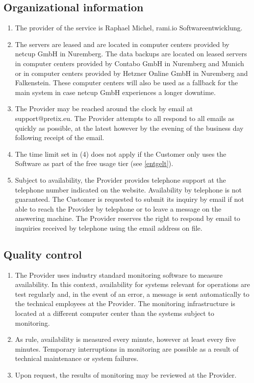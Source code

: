 \documentclass{terms}
\begin{document}
\subsection{Organizational information}
\begin{enumerate}
\item The provider of the service is Raphael Michel, rami.io Softwareentwicklung.
\item The servers are leased and are located in computer centers provided by netcup GmbH in Nuremberg. The data backups are located on leased servers in computer centers provided by Contabo GmbH in Nuremberg and Munich or in computer centers provided by Hetzner Online GmbH in Nuremberg and Falkenstein. These computer centers will also be used as a fallback for the main system in case netcup GmbH experiences a longer downtime.
\item The Provider may be reached around the clock by email at support@pretix.eu. The Provider attempts to all respond to all emails as quickly as possible, at the latest however by the evening of the business day following receipt of the email.
\item The time limit set in (4) does not apply if the Customer only uses the Software as part of the free usage tier (see \ref{entgelt}).
\item Subject to availability, the Provider provides telephone support at the telephone number indicated on the website. Availability by telephone is not guaranteed. The Customer is requested to submit its inquiry by email if not able to reach the Provider by telephone or to leave a message on the answering machine. The Provider reserves the right to respond by email to inquiries received by telephone using the email address on file.
\end{enumerate}

\subsection{Quality control}
\begin{enumerate}
\item The Provider uses industry standard monitoring software to measure availability. In this context, availability for systems relevant for operations are test regularly and, in the event of an error, a message is sent automatically to the technical employees at the Provider. The monitoring infrastructure is located at a different computer center than the systems subject to monitoring.
\item As rule, availability is measured every minute, however at least every five minutes. Temporary interruptions in monitoring are possible as a result of technical maintenance or system failures.
\item Upon request, the results of monitoring may be reviewed at the Provider.
\end{enumerate}
\end{document}
